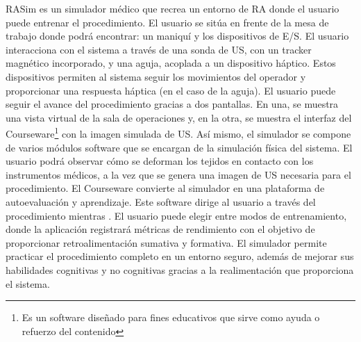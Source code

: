 %
\ac{RASim} es un simulador médico que recrea un entorno de \ac{RA} donde el usuario puede entrenar el procedimiento. El usuario se sitúa en frente de la mesa de trabajo donde podrá encontrar: un maniquí y los dispositivos de \ac{E/S}.
El usuario interacciona con el sistema a través de una sonda de \ac{US}, con un \ac{tracker} magnético incorporado, y una aguja, acoplada a un dispositivo háptico. Estos dispositivos permiten al sistema seguir los movimientos del operador y proporcionar una respuesta háptica (en el caso de la aguja).
El usuario puede seguir el avance del procedimiento gracias a dos pantallas. En una, se muestra una vista virtual de la sala de operaciones  y, en la otra, se muestra el interfaz del \ac{Courseware}\footnote{Es un software diseñado para fines educativos que sirve como ayuda o refuerzo del contenido} con la imagen simulada de \ac{US}.
%
Así mismo, el simulador se compone de varios módulos software que se encargan de la simulación física del sistema. 
El usuario podrá observar cómo se deforman los tejidos en contacto con los instrumentos médicos, a la vez que se genera una imagen de \ac{US} necesaria para el procedimiento. 
El \ac{Courseware} convierte al simulador en una plataforma de autoevaluación y aprendizaje. Este software dirige al usuario a través del procedimiento mientras . 
 El usuario puede elegir entre modos de entrenamiento, donde la  aplicación registrará métricas de rendimiento con el objetivo de proporcionar retroalimentación sumativa y formativa. 
%
El simulador permite practicar el procedimiento completo en un entorno seguro, además de mejorar sus habilidades cognitivas y no cognitivas gracias a la realimentación que proporciona el sistema.

